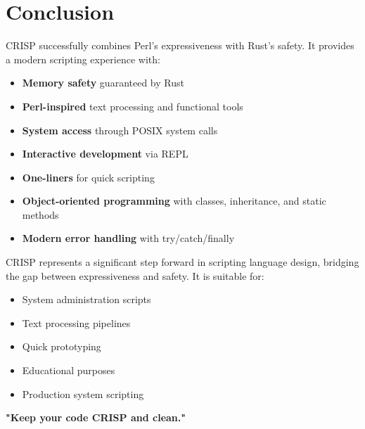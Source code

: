 \clearpage
\vspace{1.5cm}
\section{Conclusion}

CRISP successfully combines Perl's expressiveness with Rust's safety. It provides a modern scripting experience with:

\begin{itemize}
    \item \textbf{Memory safety} guaranteed by Rust
    \item \textbf{Perl-inspired} text processing and functional tools
    \item \textbf{System access} through POSIX system calls
    \item \textbf{Interactive development} via REPL
    \item \textbf{One-liners} for quick scripting
    \item \textbf{Object-oriented programming} with classes, inheritance, and static methods
    \item \textbf{Modern error handling} with try/catch/finally
\end{itemize}

\vspace{1.5cm}
\begin{tcolorbox}[colback=softviolet!20, colframe=softvioletdark, title=\textbf{\textcolor{darkpurple}{Final Assessment}}, fonttitle=\bfseries, sharp corners]
CRISP represents a significant step forward in scripting language design, bridging the gap between expressiveness and safety. It is suitable for:

\begin{itemize}
    \item System administration scripts
    \item Text processing pipelines
    \item Quick prototyping
    \item Educational purposes
    \item Production system scripting
\end{itemize}

\textbf{\textcolor{rustorange}{"Keep your code CRISP and clean."}}
\end{tcolorbox}
